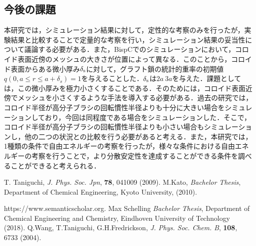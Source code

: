 \documentclass[10.5pt,a4j]{jarticle}
\begin{document}
\subsection{今後の課題}
本研究では，シミュレーション結果に対して，定性的な考察のみを行ったが，実験結果と比較することで定量的な考察を行い，シミュレーション結果の妥当性について議論する必要がある．また，BispCでのシミュレーションにおいて，コロイド表面近傍のメッシュの大きさが位置によって異なる．このことから，コロイド表面からある微小厚み$\delta_{\rm{s}}$に対して，グラフト鎖の統計的重率の初期値$q(0,a\le r\leq a+\delta_s)=1$を与えることした．$\delta_{\rm{s}}$は$2a~3a$を与えた．課題としては，この微小厚みを極力小さくすることである．そのためには，コロイド表面近傍でメッシュを小さくするような手法を導入する必要がある．過去の研究では，コロイド半径が高分子ブラシの回転慣性半径よりも十分に大きい場合をシミュレーションしており，今回は同程度である場合をシミュレーションした．そこで，コロイド半径が高分子ブラシの回転慣性半径よりも小さい場合もシミュレーションし，他の二つの状況との比較を行う必要があると考える．また，本研究では，1種類の条件で自由エネルギーの考察を行ったが，様々な条件における自由エネルギーの考察を行うことで，より分散安定性を達成することができる条件を調べることができると考えられる．
\newpage
\begin{thebibliography}{99}
      T. Taniguchi, {\it J. Phys. Soc. Jpn}, {\bf 78}, 041009 (2009).
      M.\:Kato,  {\it{Bachelor Thesis}}, Department of Chemical Engineering, Kyoto University, (2010).

      https://www.semanticscholar.org.    
      Max Schelling {\it{Bachelor Thesis}}, Department of Chemical Engineering and Chemistry, Eindhoven University of Technology (2018).
     Q.\:Wang, T.\:Taniguchi, G.\:H.\:Fredrickson, {\it J. Phys. Soc. Chem. B}, {\bf 108}, 6733 (2004).
    \end{thebibliography}
\newpage
\pagestyle{plain}
\end{document}
